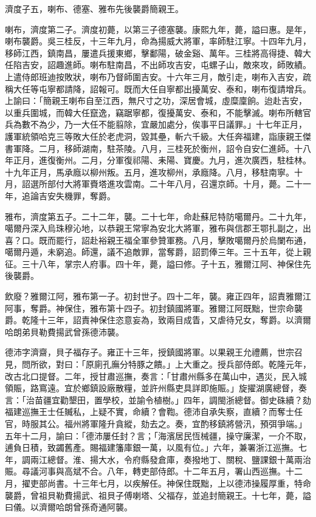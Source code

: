\begin{pinyinscope}
濟度子五，喇布、德塞、雅布先後襲爵簡親王。

喇布，濟度第二子。濟度初薨，以第三子德塞襲。康熙九年，薨，謚曰惠。是年，喇布襲爵。吳三桂反，十三年九月，命為揚威大將軍，率師駐江寧。十四年九月，移師江西，鎮南昌，屢遣兵援東鄉，擊鄱陽，破金谿、萬年。三桂將高得捷、韓大任陷吉安，詔趣進師。喇布駐南昌，不出師攻吉安，屯螺子山，敵來攻，師敗績。上遣侍郎班迪按敗狀，喇布乃督師圍吉安。十六年三月，敵引走，喇布入吉安，疏稱大任等屯寧都請降，詔報可。既而大任自寧都出擾萬安、泰和，喇布復請增兵。上諭曰：「簡親王喇布自至江西，無尺寸之功，深居會城，虛糜廩餉。迨赴吉安，以重兵圍城，而韓大任竄逸，竊踞寧都，復擾萬安、泰和，不能擊滅。喇布所轄官兵為數不為少，乃一大任不能翦除，宜嚴加處分，俟事平日議罪。」十七年正月，護軍統領哈克三等敗大任於老虎洞，毀其壘，斬六千級。大任奔福建，詣康親王傑書軍降。二月，移師湖南，駐茶陵。八月，三桂死於衡州，詔令自安仁進師。十八年正月，進復衡州。二月，分軍復祁陽、耒陽、寶慶。九月，進次廣西，駐桂林。十九年正月，馬承廕以柳州叛。五月，進攻柳州，承廕降。八月，移駐南寧。十月，詔選所部付大將軍賚塔進攻雲南。二十年八月，召還京師。十月，薨。二十一年，追論吉安失機罪，奪爵。

雅布，濟度第五子。二十二年，襲。二十七年，命赴蘇尼特防噶爾丹。二十九年，噶爾丹深入烏珠穆沁地，以恭親王常寧為安北大將軍，雅布與信郡王鄂扎副之，出喜？口。既而罷行，詔赴裕親王福全軍參贊軍務。八月，擊敗噶爾丹於烏闌布通，噶爾丹遁，未窮追。師還，議不追敵罪，當奪爵，詔罰俸三年。三十五年，從上親征。三十八年，掌宗人府事。四十年，薨，謚曰修。子十五，雅爾江阿、神保住先後襲爵。

飲廢？雅爾江阿，雅布第一子。初封世子。四十二年，襲。雍正四年，詔責雅爾江阿事，奪爵。神保住，雅布第十四子。初封鎮國將軍。雅爾江阿既黜，世宗命襲爵。乾隆十三年，詔責神保住恣意妄為，致兩目成眚，又虐待兄女，奪爵。以濟爾哈朗弟貝勒費揚武曾孫德沛襲。

德沛字濟齋，貝子福存子。雍正十三年，授鎮國將軍。以果親王允禮薦，世宗召見，問所欲，對曰：「原廁孔廡分特豚之饋。」上大重之。授兵部侍郎。乾隆元年，改古北口提督。二年，授甘肅巡撫，奏言：「甘肅州縣多在萬山中，遇災，民入城領賑，路窵遠。宜於鄉鎮設廠散糧，並許州縣吏具詳即施賑。」旋擢湖廣總督，奏言：「治苗疆宜勸墾田，置學校，並諭令植樹。」四年，調閩浙總督。御史硃續？劾福建巡撫王士任贓私，上疑不實，命續？會鞫。德沛自承失察，直續？而奪士任官，時服其公。福州將軍隆升貪縱，劾去之。奏，宜酌移鎮將營汛，預弭爭端。」五年十二月，諭曰：「德沛屢任封？言；「海濱居民恆械疆，操守廉潔，一介不取，逋負日積，致蠲舊產。賜福建籓庫銀一萬，以風有位。」六年，兼署浙江巡撫。七年，調兩江總督。淮、揚大水，令府縣發倉庫，奏撥地丁、關稅、鹽課銀十萬兩治賑。尋議河事與高斌不合。八年，轉吏部侍郎。十二年五月，署山西巡撫。十二月，擢吏部尚書。十三年七月，以疾解任。神保住既黜，上以德沛操履厚重，特命襲爵，曾祖貝勒費揚武、祖貝子傅喇塔、父福存，並追封簡親王。十七年，薨，謚曰儀。以濟爾哈朗曾孫奇通阿襲。


\end{pinyinscope}
